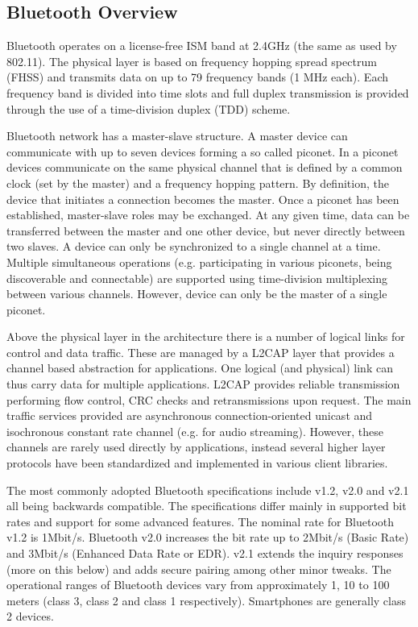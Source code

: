\subsection{Bluetooth Overview}

Bluetooth operates on a license-free ISM band at 2.4GHz (the same as used by 802.11). The physical layer is based on frequency hopping spread spectrum (FHSS) and transmits data on up to 79 frequency bands (1 MHz each). Each frequency band is divided into time slots and full duplex transmission is provided through the use of a time-division duplex (TDD) scheme.

Bluetooth network has a master-slave structure. A master device can communicate with up to seven devices forming a so called piconet. In a piconet devices communicate on the same physical channel that is defined by a common clock (set by the master) and a frequency hopping pattern. By definition, the device that initiates a connection becomes the master. Once a piconet has been established, master-slave roles may be exchanged. At any given time, data can be transferred between the master and one other device, but never directly between two slaves. A device can only be synchronized to a single channel at a time. Multiple simultaneous operations (e.g. participating in various piconets, being discoverable and connectable) are supported using time-division multiplexing between various channels. However, device can only be the master of a single piconet.

Above the physical layer in the architecture there is a number of logical links for control and data traffic. These are managed by a L2CAP layer that provides a channel based abstraction for applications. One logical (and physical) link can thus carry data for multiple applications. L2CAP provides reliable transmission performing flow control, CRC checks and retransmissions upon request. The main traffic services provided are asynchronous connection-oriented unicast and isochronous constant rate channel (e.g. for audio streaming). However, these channels are rarely used directly by applications, instead several higher layer protocols have been standardized and implemented in various client libraries. 

The most commonly adopted Bluetooth specifications include v1.2, v2.0 and v2.1 all being backwards compatible. The specifications differ mainly in supported bit rates and support for some advanced features. The nominal rate for Bluetooth v1.2 is 1Mbit/s. Bluetooth v2.0 increases the bit rate up to 2Mbit/s (Basic Rate) and 3Mbit/s (Enhanced Data Rate or EDR). v2.1 extends the inquiry responses (more on this below) and adds secure pairing among other minor tweaks. The operational ranges of Bluetooth devices vary from approximately 1, 10 to 100 meters (class 3, class 2 and class 1 respectively). Smartphones are generally class 2 devices.

